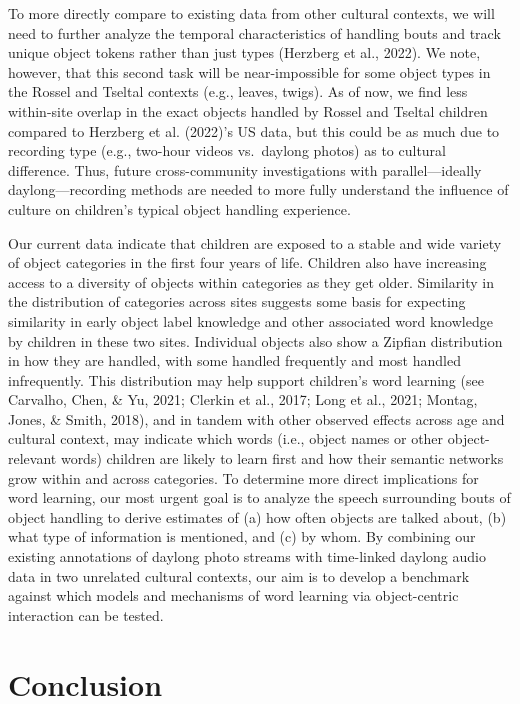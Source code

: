 \documentclass[10pt, letterpaper]{article}
\begin{document}
To more directly compare to existing data from other cultural contexts,
we will need to further analyze the temporal characteristics of handling
bouts and track unique object tokens rather than just types (Herzberg et
al., 2022). We note, however, that this second task will be
near-impossible for some object types in the Rossel and Tseltal contexts
(e.g., leaves, twigs). As of now, we find less within-site overlap in
the exact objects handled by Rossel and Tseltal children compared to
Herzberg et al. (2022)'s US data, but this could be as much due to
recording type (e.g., two-hour videos vs.~daylong photos) as to cultural
difference. Thus, future cross-community investigations with
parallel---ideally daylong---recording methods are needed to more fully
understand the influence of culture on children's typical object
handling experience.

Our current data indicate that children are exposed to a stable and wide
variety of object categories in the first four years of life. Children
also have increasing access to a diversity of objects within categories
as they get older. Similarity in the distribution of categories across
sites suggests some basis for expecting similarity in early object label
knowledge and other associated word knowledge by children in these two
sites. Individual objects also show a Zipfian distribution in how they
are handled, with some handled frequently and most handled infrequently.
This distribution may help support children's word learning (see
Carvalho, Chen, \& Yu, 2021; Clerkin et al., 2017; Long et al., 2021;
Montag, Jones, \& Smith, 2018), and in tandem with other observed
effects across age and cultural context, may indicate which words (i.e.,
object names or other object-relevant words) children are likely to
learn first and how their semantic networks grow within and across
categories. To determine more direct implications for word learning, our
most urgent goal is to analyze the speech surrounding bouts of object
handling to derive estimates of (a) how often objects are talked about,
(b) what type of information is mentioned, and (c) by whom. By combining
our existing annotations of daylong photo streams with time-linked
daylong audio data in two unrelated cultural contexts, our aim is to
develop a benchmark against which models and mechanisms of word learning
via object-centric interaction can be tested.

\hypertarget{conclusion}{%
\section{Conclusion}\label{conclusion}}
\end{document}
